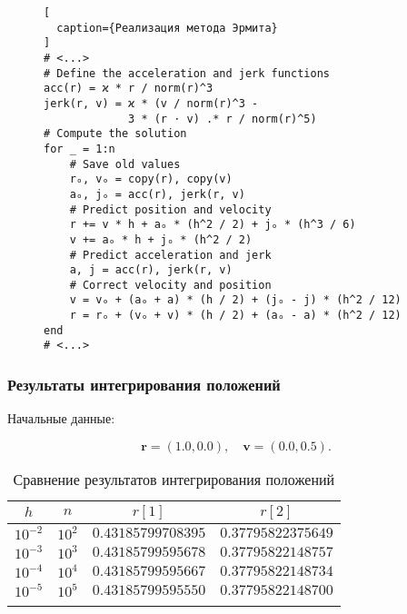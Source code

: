 \begin{frame}[fragile]

\begin{figure}[h!]
\begin{lstlisting}[
  caption={Реализация метода Эрмита}
]
# <...>
# Define the acceleration and jerk functions
acc(r) = ϰ * r / norm(r)^3
jerk(r, v) = ϰ * (v / norm(r)^3 -
             3 * (r ⋅ v) .* r / norm(r)^5)
# Compute the solution
for _ = 1:n
    # Save old values
    rₒ, vₒ = copy(r), copy(v)
    aₒ, jₒ = acc(r), jerk(r, v)
    # Predict position and velocity
    r += v * h + aₒ * (h^2 / 2) + jₒ * (h^3 / 6)
    v += aₒ * h + jₒ * (h^2 / 2)
    # Predict acceleration and jerk
    a, j = acc(r), jerk(r, v)
    # Correct velocity and position
    v = vₒ + (aₒ + a) * (h / 2) + (jₒ - j) * (h^2 / 12)
    r = rₒ + (vₒ + v) * (h / 2) + (aₒ - a) * (h^2 / 12)
end
# <...>
\end{lstlisting}
\end{figure}

\end{frame}

\captionsetup{justification=centering}

\begin{frame}
\frametitle{Результаты интегрирования положений}

Начальные данные:

\su
\begin{equation}
  \mathbf{r} = (1.0, 0.0), \quad \mathbf{v} = (0.0, 0.5).
\end{equation}

\begin{table}[h]
  \centering
  \caption{Сравнение результатов интегрирования положений}
  \begin{tabular}{cccc}
    \toprule
    $ h $ &
    $ n $ &
    $ r[1] $ &
    $ r[2] $ \\
    \midrule
    $ 10^{-2} $ & $ 10^2 $ & $ 0.43185799708395 $ & $ 0.37795822375649 $ \\
    \arrayrulecolor{black!40}
    \midrule
    $ 10^{-3} $ & $ 10^3 $ & $ 0.43185799595678 $ & $ 0.37795822148757 $ \\
    \midrule
    $ 10^{-4} $ & $ 10^4 $ & $ 0.43185799595667 $ & $ 0.37795822148734 $ \\
    \midrule
    $ 10^{-5} $ & $ 10^5 $ & $ 0.43185799595550 $ & $ 0.37795822148700 $ \\
    \arrayrulecolor{black}
    \bottomrule
  \end{tabular}
\end{table}

\end{frame}

